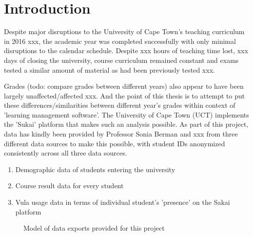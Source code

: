 % 

\section{Introduction}
Despite major disruptions to the University of Cape Town's teaching curriculum in 2016 xxx, the academic year was completed successfully with only minimal disruptions to the calendar schedule. Despite xxx hours of teaching time lost, xxx days of closing the university, course curriculum remained constant and exams tested a similar amount of material as had been previously tested xxx.

Grades (todo: compare grades between different years) also appear to have been largely unaffected/affected xxx. And the point of this thesis is to attempt to put these differences/similarities between different year's grades within context of 'learning management software'. The University of Cape Town (UCT) implements the 'Sukai' platform that makes such an analysis possible. As part of this project, data has kindly been provided by Professor Sonia Berman and xxx from three different data sources to make this possible, with student IDs anonymized consistently across all three data sources.

\begin{enumerate}
    \item Demographic data of students entering the university
    \item Course result data for every student
    \item Vula usage data in terms of individual student's 'presence' on the Sakai platform
\end{enumerate}

\begin{figure}[h]
    \centering
    \caption[DataModel]{Model of data exports provided for this project}
    \label{DataModel}
\end{figure}

